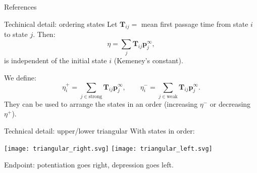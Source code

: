 \documentclass{beamer}%
\newcommand{\pr}{\mathbf{p}}
\newcommand{\eq}{\pr^\infty}
\newcommand{\fpt}{\mathbf{T}}
\begin{document}
\begin{frame}[allowframebreaks]{References}
%

 {\small
 
 
 }
%
\end{frame}


\begin{frame}[label=fr_tech]{Techinical detail: ordering states}
%
 Let $\fpt_{ij}=$ mean first passage time from state $i$ to state $j$.
 Then:
 \begin{equation*}
   \eta = \sum_j \fpt_{ij} \eq_j,
 \end{equation*}
 is independent of the initial state $i$
 (Kemeney's constant).\\ 

 \vp We define:
 \begin{equation*}
   \eta^+_i = \sum_{j\in\text{strong}} \fpt_{ij} \eq_j,
   \qquad
   \eta^-_i = \sum_{j\in\text{weak}} \fpt_{ij} \eq_j.
 \end{equation*}
 They can be used to arrange the states in an order (increasing $\eta^-$ or decreasing $\eta^+$).
 \hyperlink{fr_areaproof}{}
%
\end{frame}


\begin{frame}{Technical detail: upper/lower triangular}
%
 With states in order:
 \begin{center}
   \texttt{[image: triangular\_right.svg]}
   \hp \hp \hp
   \texttt{[image: triangular\_left.svg]}
 \end{center}
 Endpoint: potentiation goes right, depression goes left.

 \hyperlink{fr_areaproof}{}
%
\end{frame}


\end{document}
